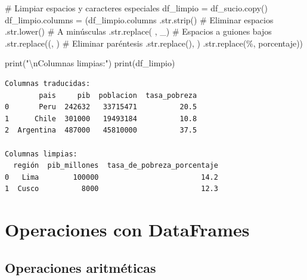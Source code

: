\documentclass[
  doc,
  floatsintext,
  longtable,
  a4paper,
  nolmodern,
  notxfonts,
  notimes,
  12pt,
  colorlinks=true,linkcolor=blue,citecolor=blue,urlcolor=blue]{apa7}
\newenvironment{Shaded}{\begin{snugshade}}{\end{snugshade}}
\newcommand{\BuiltInTok}[1]{\textcolor[rgb]{0.00,0.23,0.31}{#1}}
\newcommand{\CharTok}[1]{\textcolor[rgb]{0.13,0.47,0.30}{#1}}
\newcommand{\CommentTok}[1]{\textcolor[rgb]{0.37,0.37,0.37}{#1}}
\newcommand{\NormalTok}[1]{\textcolor[rgb]{0.00,0.23,0.31}{#1}}
\newcommand{\OperatorTok}[1]{\textcolor[rgb]{0.37,0.37,0.37}{#1}}
\newcommand{\StringTok}[1]{\textcolor[rgb]{0.13,0.47,0.30}{#1}}
\begin{document}
\begin{Shaded}
\begin{Highlighting}[]
\CommentTok{\# Limpiar espacios y caracteres especiales}
\NormalTok{df\_limpio }\OperatorTok{=}\NormalTok{ df\_sucio.copy()}
\NormalTok{df\_limpio.columns }\OperatorTok{=}\NormalTok{ (df\_limpio.columns}
\NormalTok{                     .}\BuiltInTok{str}\NormalTok{.strip()  }\CommentTok{\# Eliminar espacios}
\NormalTok{                     .}\BuiltInTok{str}\NormalTok{.lower()  }\CommentTok{\# A minúsculas}
\NormalTok{                     .}\BuiltInTok{str}\NormalTok{.replace(}\StringTok{\textquotesingle{} \textquotesingle{}}\NormalTok{, }\StringTok{\textquotesingle{}\_\textquotesingle{}}\NormalTok{)  }\CommentTok{\# Espacios a guiones bajos}
\NormalTok{                     .}\BuiltInTok{str}\NormalTok{.replace(}\StringTok{\textquotesingle{}(\textquotesingle{}}\NormalTok{, }\StringTok{\textquotesingle{}\textquotesingle{}}\NormalTok{)  }\CommentTok{\# Eliminar paréntesis}
\NormalTok{                     .}\BuiltInTok{str}\NormalTok{.replace(}\StringTok{\textquotesingle{})\textquotesingle{}}\NormalTok{, }\StringTok{\textquotesingle{}\textquotesingle{}}\NormalTok{)}
\NormalTok{                     .}\BuiltInTok{str}\NormalTok{.replace(}\StringTok{\textquotesingle{}\%\textquotesingle{}}\NormalTok{, }\StringTok{\textquotesingle{}porcentaje\textquotesingle{}}\NormalTok{))}

\BuiltInTok{print}\NormalTok{(}\StringTok{"}\CharTok{\textbackslash{}n}\StringTok{Columnas limpias:"}\NormalTok{)}
\BuiltInTok{print}\NormalTok{(df\_limpio)}
\end{Highlighting}
\end{Shaded}

\begin{verbatim}
Columnas traducidas:
        pais     pib  poblacion  tasa_pobreza
0       Peru  242632   33715471          20.5
1      Chile  301000   19493184          10.8
2  Argentina  487000   45810000          37.5

Columnas limpias:
  región  pib_millones  tasa_de_pobreza_porcentaje
0   Lima        100000                        14.2
1  Cusco          8000                        12.3
\end{verbatim}

\section{Operaciones con DataFrames}\label{operaciones-con-dataframes}

\subsection{Operaciones aritméticas}\label{operaciones-aritmuxe9ticas}
\end{document}
